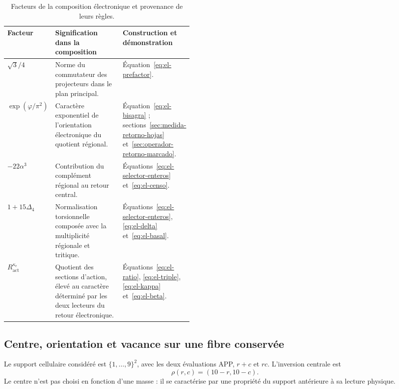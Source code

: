 \begin{table}[htbp]
\centering
\small
\setlength{\tabcolsep}{4pt}
\renewcommand{\arraystretch}{1.18}
\begin{tabularx}{\linewidth}{@{}p{0.20\linewidth}Xp{0.24\linewidth}@{}}
\toprule
Facteur & Signification dans la composition & Construction et démonstration\\
\midrule
\(\sqrt3/4\)
 & Norme du commutateur des projecteurs dans le plan principal.
 & Équation~\eqref{eq:el-prefactor}.\\
\(\exp(\varphi/\pi^2)\)
 & Caractère exponentiel de l'orientation électronique du quotient régional.
 & Équation~\eqref{eq:el-bisagra} ; sections~\ref{sec:medida-retorno-hojas}
   et~\ref{sec:operador-retorno-marcado}.\\
\(-22\alpha^3\)
 & Contribution du complément régional au retour central.
 & Équations~\eqref{eq:el-selector-enteros} et~\eqref{eq:el-censo}.\\
\(1+15\Delta_4\)
 & Normalisation torsionnelle composée avec la multiplicité régionale
   et tritique.
 & Équations~\eqref{eq:el-selector-enteros}, \eqref{eq:el-delta}
   et~\eqref{eq:el-basal}.\\
\(R_{\mathrm{act}}^{\kappa_e}\)
 & Quotient des sections d'action, élevé au caractère déterminé par les deux lecteurs du retour électronique.
 & Équations~\eqref{eq:el-ratio}, \eqref{eq:el-triple},
   \eqref{eq:el-kappa} et~\eqref{eq:el-beta}.\\
\bottomrule
\end{tabularx}
\caption{Facteurs de la composition électronique et provenance de leurs règles.}
\label{tab:el-factores}
\end{table}



\subsection{Centre, orientation et vacance sur une fibre conservée}

Le support cellulaire considéré est \(\{1,\ldots,9\}^2\), avec les deux
évaluations APP, \(r+c\) et \(rc\). L'inversion centrale est
\begin{equation}
 \rho(r,c)=(10-r,10-c).
 \label{eq:el-inversion-central}
\end{equation}
Le centre n'est pas choisi en fonction d'une masse : il se caractérise par une propriété du
support antérieure à sa lecture physique.

